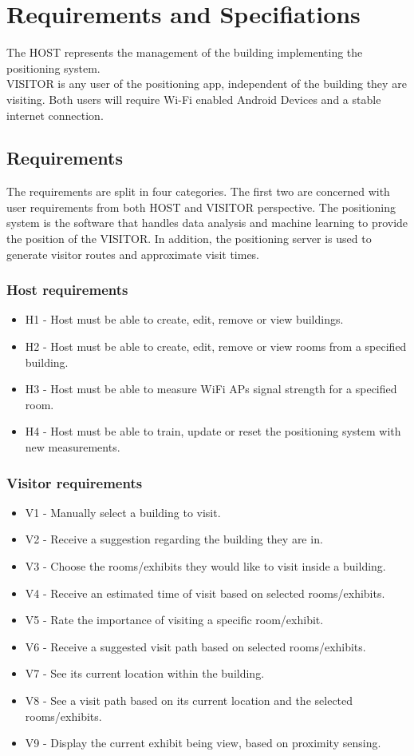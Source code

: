 \chapter{Requirements and Specifiations}
\noindent The HOST represents the management of the building implementing the positioning system.\\ 
VISITOR is any user of the positioning app, independent of the building they are visiting.
Both users will require Wi-Fi enabled Android Devices and a stable internet connection.

\section{Requirements}
The requirements are split in four categories. The first two are concerned with user requirements from both HOST and VISITOR perspective. The positioning system is the software that handles data analysis and machine learning to provide the position of the VISITOR. In addition, the positioning server is used to generate visitor routes and approximate visit times.

\subsection{Host requirements}
	\begin{itemize}
		\item H1 - Host must be able to create, edit, remove or view buildings.
		\item H2 - Host must be able to create, edit, remove or view rooms from a specified building.
		\item H3 - Host must be able to measure WiFi APs signal strength for a specified room.
		\item H4 - Host must be able to train, update or reset the positioning system with new measurements.
	\end{itemize}

\subsection{Visitor requirements}
	\begin{itemize}
		\item V1 - Manually select a building to visit.
		\item V2 - Receive a suggestion regarding the building they are in.
		\item V3 - Choose the rooms/exhibits they would like to visit inside a building.
		\item V4 - Receive an estimated time of visit based on selected rooms/exhibits.
		\item V5 - Rate the importance of visiting a specific room/exhibit.
		\item V6 - Receive a suggested visit path based on selected rooms/exhibits.
		\item V7 - See its current location within the building.
		\item V8 - See a visit path based on its current location and the selected rooms/exhibits.
		\item V9 - Display the current exhibit being view, based on proximity sensing.
	\end{itemize}

